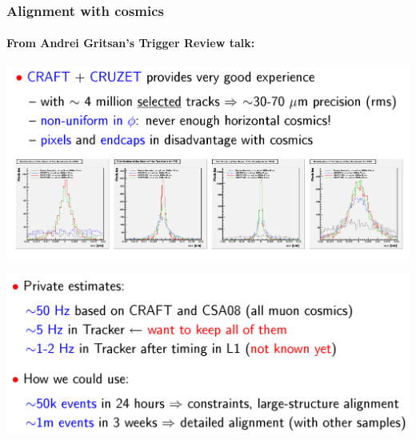 \documentclass[compress]{beamer}
\begin{document}
\begin{frame}
\frametitle{Alignment with cosmics}
\framesubtitle{From Andrei Gritsan's Trigger Review talk:}

\includegraphics[width=0.85\linewidth]{andrei1.png}

\includegraphics[width=0.85\linewidth]{andrei2.png}

\end{frame}
\end{document}
